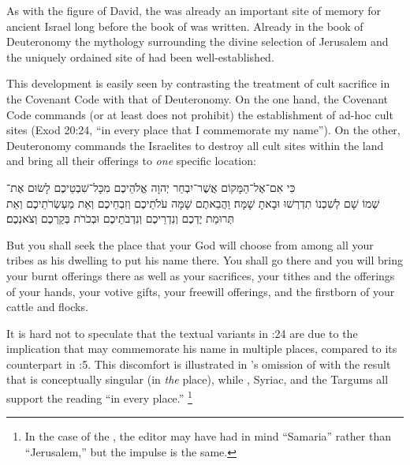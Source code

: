 As with the figure of David, the \jerusalemtemple was already an important site of memory for ancient Israel long before the book of \chronicles was written. Already in the book of Deuteronomy the mythology surrounding the divine selection of Jerusalem and the uniquely ordained site of \solomonstemple had been well-established.%
    \autocite{cogan_tarbiz1986}

This development is easily seen by contrasting the treatment of cult sacrifice in the Covenant Code with that of Deuteronomy. On the one hand, the Covenant Code commands (or at least does not prohibit) the establishment of ad-hoc cult sites (Exod 20:24,  ``in every place that I commemorate my name''). On the other, Deuteronomy commands the Israelites to destroy all cult sites within the land and bring all their offerings to \emph{one} specific location:
\begin{hebrewtext}
    כִּי אִם־אֶל־הַמָּקוֹם אֲשֶׁר־יִבְחַר יְהוָה אֱלֹהֵיכֶם מִכָּל־שִׁבְטֵיכֶם לָשׂוּם אֶת־\\שְׁמוֹ שָׁם לְשִׁכְנוֹ תִדְרְשׁוּ וּבָאתָ שָׁמָּה׃
    וַהֲבֵאתֶם שָׁמָּה עֹלֹתֵיכֶם וְזִבְחֵיכֶם וְאֵת מַעְשְׂרֹתֵיכֶם וְאֵת תְּרוּמַת יֶדְכֶם וְנִדְרֵיכֶם וְנִדְבֹתֵיכֶם וּבְכֹרֹת בְּקַרְכֶם וְצֹאנְכֶם׃
\end{hebrewtext}
\begin{translation}
    But you shall seek the place that \yahweh your God will choose from among all your tribes as his dwelling to put his name there. You shall go there
    and you will bring your burnt offerings there as well as your sacrifices, your tithes and the offerings of your hands, your votive gifts, your freewill offerings, and the firstborn of your cattle and flocks. 
\end{translation}
\noindent
It is hard not to speculate that the textual variants in :24 are due to the implication that \yahweh may commemorate his name in multiple places, compared to its counterpart in :5. This discomfort is illustrated in  \sampent's omission of  with the result that  is conceptually singular (in \emph{the} place), while \lxx, Syriac, and the Targums all support the reading ``in every place.''%
    \footnote{In the case of the \sampent, the editor may have had in mind ``Samaria'' rather than ``Jerusalem,'' but the impulse is the same.}
